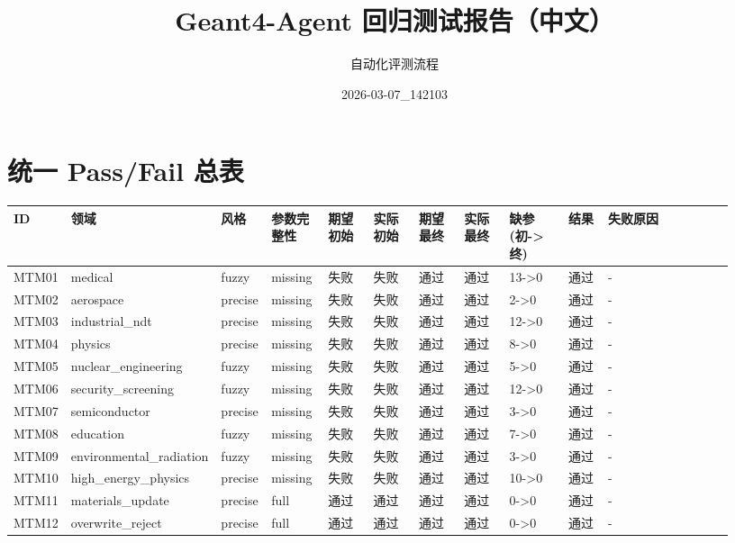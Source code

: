 \documentclass[11pt]{ctexart}
\title{Geant4-Agent 回归测试报告（中文）}
\author{自动化评测流程}
\date{2026-03-07\_142103}
\begin{document}
\maketitle
\section{统一 Pass/Fail 总表}
\begin{longtable}{p{0.06\linewidth}p{0.08\linewidth}p{0.07\linewidth}p{0.08\linewidth}p{0.07\linewidth}p{0.07\linewidth}p{0.07\linewidth}p{0.07\linewidth}p{0.09\linewidth}p{0.06\linewidth}p{0.21\linewidth}}
\toprule
ID & 领域 & 风格 & 参数完整性 & 期望初始 & 实际初始 & 期望最终 & 实际最终 & 缺参(初->终) & 结果 & 失败原因 \\
\midrule
MTM01 & medical & fuzzy & missing & 失败 & 失败 & 通过 & 通过 & 13->0 & 通过 & - \\
MTM02 & aerospace & precise & missing & 失败 & 失败 & 通过 & 通过 & 2->0 & 通过 & - \\
MTM03 & industrial\_ndt & precise & missing & 失败 & 失败 & 通过 & 通过 & 12->0 & 通过 & - \\
MTM04 & physics & precise & missing & 失败 & 失败 & 通过 & 通过 & 8->0 & 通过 & - \\
MTM05 & nuclear\_engineering & fuzzy & missing & 失败 & 失败 & 通过 & 通过 & 5->0 & 通过 & - \\
MTM06 & security\_screening & fuzzy & missing & 失败 & 失败 & 通过 & 通过 & 12->0 & 通过 & - \\
MTM07 & semiconductor & precise & missing & 失败 & 失败 & 通过 & 通过 & 3->0 & 通过 & - \\
MTM08 & education & fuzzy & missing & 失败 & 失败 & 通过 & 通过 & 7->0 & 通过 & - \\
MTM09 & environmental\_radiation & fuzzy & missing & 失败 & 失败 & 通过 & 通过 & 3->0 & 通过 & - \\
MTM10 & high\_energy\_physics & precise & missing & 失败 & 失败 & 通过 & 通过 & 10->0 & 通过 & - \\
MTM11 & materials\_update & precise & full & 通过 & 通过 & 通过 & 通过 & 0->0 & 通过 & - \\
MTM12 & overwrite\_reject & precise & full & 通过 & 通过 & 通过 & 通过 & 0->0 & 通过 & - \\
\bottomrule
\end{longtable}
\end{document}
